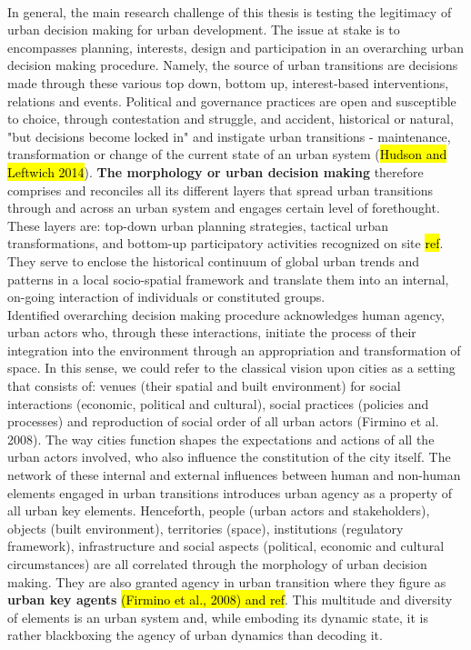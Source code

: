 \documentclass[11pt]{report}
\begin{document}
\\
In general, the main research challenge of this thesis is testing the legitimacy of urban decision making for urban development. The issue at stake is to encompasses planning, interests, design and participation in an overarching urban decision making procedure. Namely, the source of urban transitions are decisions made through these various top down, bottom up, interest-based interventions, relations and events. Political and governance practices are open and susceptible to choice, through contestation and struggle, and accident, historical or natural, "but decisions become locked in" and instigate urban transitions - maintenance, transformation or change of the current state of an urban system (\hl{Hudson and Leftwich 2014}). \textbf{The morphology or urban decision making} therefore comprises and reconciles all its different layers that spread urban transitions through and across an urban system and engages certain level of forethought. These layers are: top-down urban planning strategies, tactical urban transformations, and bottom-up participatory activities recognized on site \hl{ref}. They serve to enclose the historical continuum of global urban trends and patterns in a local socio-spatial framework and translate them into an internal, on-going interaction of individuals or constituted groups.
\\
Identified overarching decision making procedure acknowledges human agency, urban actors who, through these interactions, initiate the process of their integration into the environment through an appropriation and transformation of space. In this sense, we could refer to the classical vision upon cities as a setting that consists of: venues (their spatial and built environment) for social interactions (economic, political and cultural), social practices (policies and processes) and reproduction of social order of all urban actors (Firmino et al. 2008). The way cities function shapes the expectations and actions of all the urban actors involved, who also influence the constitution of the city itself. The network of these internal and external influences between human and non-human elements engaged in urban transitions introduces urban agency as a property of all urban key elements. Henceforth, people (urban actors and stakeholders), objects (built environment), territories (space), institutions (regulatory framework), infrastructure and social  aspects (political, economic and cultural circumstances) are all correlated through the morphology of urban decision making. They are also granted agency in urban transition where they figure as \textbf{urban key agents} \hl{(Firmino et al., 2008) and ref}. This multitude and diversity of elements is an urban system and, while emboding its dynamic state, it is rather blackboxing the agency of urban dynamics than decoding it.
\end{document}
